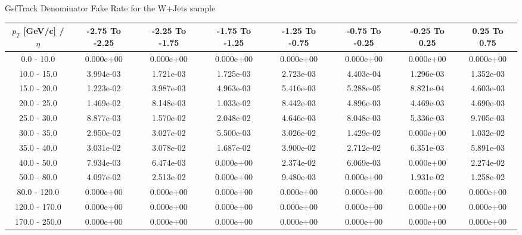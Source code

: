 \large 
GsfTrack Denominator Fake Rate for the W+Jets sample
\footnotesize 
\begin{tabular*}{\textwidth}{|c|c|c|c|c|c|c|c|}\hline 
$p_T$ [GeV/c] / $\eta$  & -2.75 To -2.25 & -2.25 To -1.75 & -1.75 To -1.25 & -1.25 To -0.75 & -0.75 To -0.25 & -0.25 To 0.25 & 0.25 To 0.75 \\ 
 \hline 
0.0 - 10.0 & 0.000e+00 & 0.000e+00 & 0.000e+00 & 0.000e+00 & 0.000e+00 & 0.000e+00 & 0.000e+00 \\ 
10.0 - 15.0 & 3.994e-03 & 1.721e-03 & 1.725e-03 & 2.723e-03 & 4.403e-04 & 1.296e-03 & 1.352e-03 \\ 
15.0 - 20.0 & 1.223e-02 & 3.987e-03 & 4.963e-03 & 5.416e-03 & 5.288e-05 & 8.821e-04 & 4.603e-03 \\ 
20.0 - 25.0 & 1.469e-02 & 8.148e-03 & 1.033e-02 & 8.442e-03 & 4.896e-03 & 4.469e-03 & 4.690e-03 \\ 
25.0 - 30.0 & 8.877e-03 & 1.570e-02 & 2.048e-02 & 4.646e-03 & 8.048e-03 & 5.336e-03 & 9.705e-03 \\ 
30.0 - 35.0 & 2.950e-02 & 3.027e-02 & 5.500e-03 & 3.026e-02 & 1.429e-02 & 0.000e+00 & 1.032e-02 \\ 
35.0 - 40.0 & 3.031e-02 & 3.078e-02 & 1.687e-02 & 3.900e-02 & 2.712e-02 & 6.351e-03 & 5.891e-03 \\ 
40.0 - 50.0 & 7.934e-03 & 6.474e-03 & 0.000e+00 & 2.374e-02 & 6.069e-03 & 0.000e+00 & 2.274e-02 \\ 
50.0 - 80.0 & 4.097e-02 & 2.513e-02 & 0.000e+00 & 9.480e-03 & 0.000e+00 & 1.931e-02 & 1.258e-02 \\ 
80.0 - 120.0 & 0.000e+00 & 0.000e+00 & 0.000e+00 & 0.000e+00 & 0.000e+00 & 0.000e+00 & 0.000e+00 \\ 
120.0 - 170.0 & 0.000e+00 & 0.000e+00 & 0.000e+00 & 0.000e+00 & 0.000e+00 & 0.000e+00 & 0.000e+00 \\ 
170.0 - 250.0 & 0.000e+00 & 0.000e+00 & 0.000e+00 & 0.000e+00 & 0.000e+00 & 0.000e+00 & 0.000e+00 \\ 
 \hline 
\end{tabular*} 
